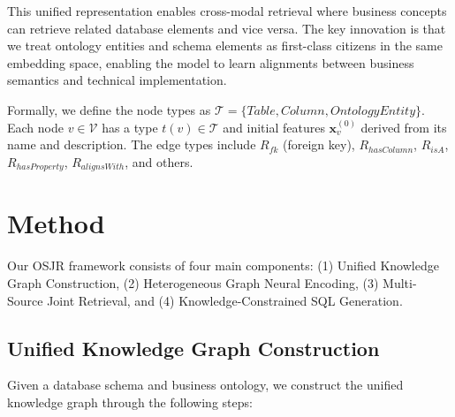 \documentclass[sigconf, nonatbib]{acmart}
\begin{document}
This unified representation enables cross-modal retrieval where business concepts can retrieve related database elements and vice versa. The key innovation is that we treat ontology entities and schema elements as first-class citizens in the same embedding space, enabling the model to learn alignments between business semantics and technical implementation.

Formally, we define the node types as $\mathcal{T} = \{Table, Column, OntologyEntity\}$. Each node $v \in \mathcal{V}$ has a type $t(v) \in \mathcal{T}$ and initial features $\mathbf{x}_v^{(0)}$ derived from its name and description. The edge types include $R_{fk}$ (foreign key), $R_{hasColumn}$, $R_{isA}$, $R_{hasProperty}$, $R_{alignsWith}$, and others.

\section{Method}
\label{sec:method}

Our OSJR framework consists of four main components: (1) Unified Knowledge Graph Construction, (2) Heterogeneous Graph Neural Encoding, (3) Multi-Source Joint Retrieval, and (4) Knowledge-Constrained SQL Generation.

\subsection{Unified Knowledge Graph Construction}

Given a database schema and business ontology, we construct the unified knowledge graph through the following steps:
\end{document}
